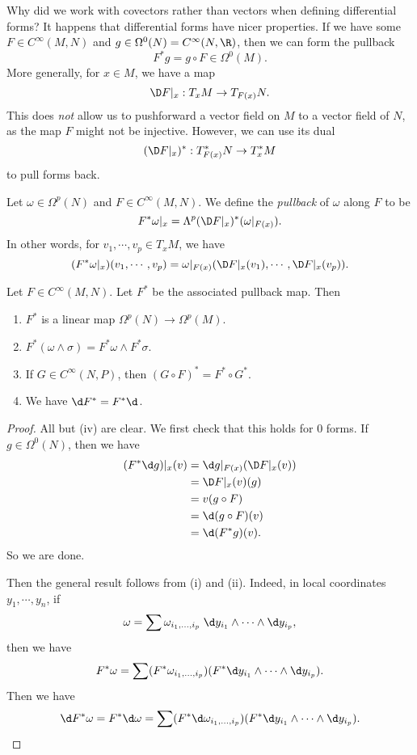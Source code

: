 \documentclass[a4paper]{article}
\begin{document}
Why did we work with covectors rather than vectors when defining differential forms? It happens that differential forms have nicer properties. If we have some $F \in C^\infty(M, N)$ and $g \in \Omega^0(N) = C^{\infty}(N, \R)$, then we can form the pullback
\[
  F^*g = g \circ F \in \Omega^0(M).
\]
More generally, for $x \in M$, we have a map
\[
  \D F|_x : T_x M \to T_{F(x)}N.
\]
This does \emph{not} allow us to pushforward a vector field on $M$ to a vector field of $N$, as the map $F$ might not be injective. However, we can use its dual
\[
  (\D F|_x)^*: T_{F(x)}^* N \to T_x^* M
\]
to pull forms back.
\begin{defi}
  Let $\omega \in \Omega^p(N)$ and $F \in C^\infty(M, N)$. We define the \emph{pullback} of $\omega$ along $F$ to be
  \[
    F^* \omega|_x = \Lambda^p(\D F|_x)^*(\omega|_{F(x)}).
  \]
  In other words, for $v_1, \cdots, v_p \in T_x M$, we have
  \[
    (F^*\omega|_x)(v_1, \cdots, v_p) = \omega|_{F(x)} (\D F|_x(v_1), \cdots, \D F|_x(v_p)).
  \]
\end{defi}

\begin{lemma}
  Let $F \in C^\infty(M, N)$. Let $F^*$ be the associated pullback map. Then
  \begin{enumerate}
    \item $F^*$ is a linear map $\Omega^p(N) \to \Omega^p(M)$.
    \item $F^*(\omega \wedge \sigma) = F^*\omega \wedge F^*\sigma$.
    \item If $G \in C^\infty (N, P)$, then $(G \circ F)^* = F^* \circ G^*$.
    \item We have $\d F^* = F^* \d$.
  \end{enumerate}
\end{lemma}

\begin{proof}
  All but (iv) are clear. We first check that this holds for $0$ forms. If $g \in \Omega^0(N)$, then we have
  \begin{align*}
    (F^* \d g)|_x(v) &= \d g|_{F(x)} (\D F|_x (v)) \\
    &= \D F|_x(v)(g) \\
    &= v(g \circ F) \\
    &= \d (g \circ F)(v) \\
    &= \d (F^* g)(v).
  \end{align*}
  So we are done.

  Then the general result follows from (i) and (ii). Indeed, in local coordinates $y_1, \cdots, y_n$, if
  \[
    \omega = \sum\omega_{i_1, \ldots, i_p}\; \d y_{i_1} \wedge \cdots \wedge \d y_{i_p},
  \]
  then we have
  \[
    F^* \omega = \sum (F^* \omega_{i_1, \ldots, i_p}) (F^* \d y_{i_1} \wedge \cdots \wedge \d y_{i_p}).
  \]
  Then we have
  \[
    \d F^* \omega = F^* \d \omega = \sum (F^* \d \omega_{i_1, \ldots, i_p}) (F^* \d y_{i_1} \wedge \cdots \wedge \d y_{i_p}). \qedhere
  \]
\end{proof}
\end{document}
